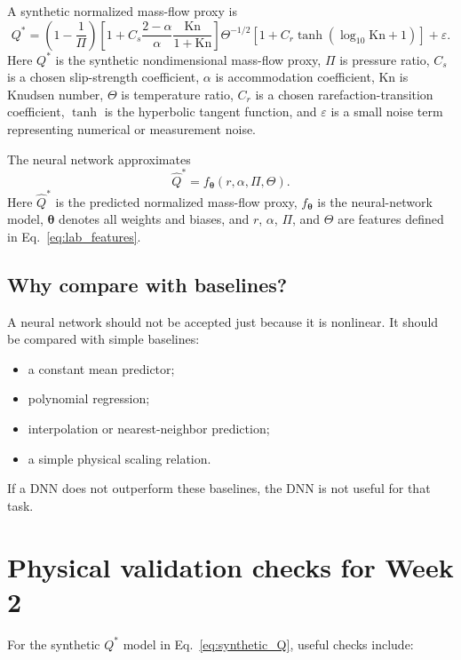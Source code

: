\documentclass[11pt]{article}
\newcommand{\kn}{\mathrm{Kn}}
\newcommand{\eps}{\varepsilon}
\newcommand{\btheta}{\bm{\theta}}
\begin{document}
A synthetic normalized mass-flow proxy is
\begin{equation}
    Q^* = \left(1-\frac{1}{\Pi}\right)
    \left[1 + C_s\frac{2-\alpha}{\alpha}\frac{\kn}{1+\kn}\right]
    \Theta^{-1/2}
    \left[1+C_r\tanh\left(\log_{10}\kn+1\right)\right]
    +\eps.
    \label{eq:synthetic_Q}
\end{equation}
Here $Q^*$ is the synthetic nondimensional mass-flow proxy, $\Pi$ is pressure ratio, $C_s$ is a chosen slip-strength coefficient, $\alpha$ is accommodation coefficient, $\kn$ is Knudsen number, $\Theta$ is temperature ratio, $C_r$ is a chosen rarefaction-transition coefficient, $\tanh$ is the hyperbolic tangent function, and $\eps$ is a small noise term representing numerical or measurement noise.

The neural network approximates
\begin{equation}
    \widehat{Q}^* = f_{\btheta}(r,\alpha,\Pi,\Theta).
    \label{eq:network_Q}
\end{equation}
Here $\widehat{Q}^*$ is the predicted normalized mass-flow proxy, $f_{\btheta}$ is the neural-network model, $\btheta$ denotes all weights and biases, and $r$, $\alpha$, $\Pi$, and $\Theta$ are features defined in Eq.~\eqref{eq:lab_features}.

\subsection{Why compare with baselines?}

A neural network should not be accepted just because it is nonlinear.  It should be compared with simple baselines:
\begin{itemize}
    \item a constant mean predictor;
    \item polynomial regression;
    \item interpolation or nearest-neighbor prediction;
    \item a simple physical scaling relation.
\end{itemize}

If a DNN does not outperform these baselines, the DNN is not useful for that task.

\section{Physical validation checks for Week 2}

For the synthetic $Q^*$ model in Eq.~\eqref{eq:synthetic_Q}, useful checks include:
\end{document}
